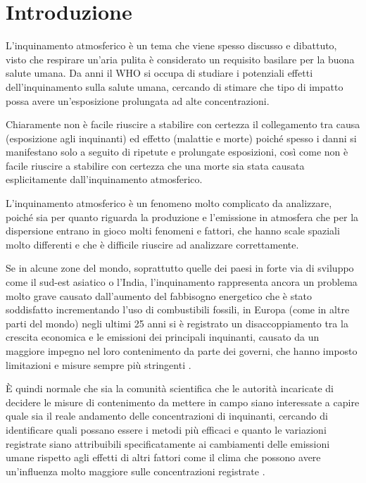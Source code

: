 \documentclass[a4paper]{report}
\begin{document}
\tableofcontents


\chapter{Introduzione}
L'inquinamento atmosferico è un tema che viene spesso discusso e dibattuto, visto che respirare un'aria pulita è considerato un requisito basilare per la buona salute umana. Da anni il WHO \cite{world2006air} si occupa di studiare i potenziali effetti dell'inquinamento sulla salute umana, cercando di stimare che tipo di impatto possa avere un'esposizione prolungata ad alte concentrazioni.  

Chiaramente non è facile riuscire a stabilire con certezza il collegamento tra causa (esposizione agli inquinanti) ed effetto (malattie e morte) poiché spesso i danni si manifestano solo a seguito di ripetute e prolungate esposizioni, così come non è facile riuscire a stabilire con certezza che una morte sia stata causata esplicitamente dall'inquinamento atmosferico.  

L'inquinamento atmosferico è un fenomeno molto complicato da analizzare, poiché sia per quanto riguarda la produzione e l'emissione in atmosfera che per la dispersione entrano in gioco molti fenomeni e fattori, che hanno scale spaziali molto differenti e che è difficile riuscire ad analizzare correttamente.  

Se in alcune zone del mondo, soprattutto quelle dei paesi in forte via di sviluppo come il sud-est asiatico o l'India, l'inquinamento rappresenta ancora un problema molto grave causato dall'aumento del fabbisogno energetico che è stato soddisfatto incrementando l'uso di combustibili fossili, in Europa (come in altre parti del mondo) negli ultimi 25 anni si è registrato un disaccoppiamento tra la crescita economica e le emissioni dei principali inquinanti, causato da un maggiore impegno nel loro contenimento da parte dei governi, che hanno imposto limitazioni e misure sempre più stringenti \cite{cattani2014analisi}.

È quindi normale che sia la comunità scientifica che le autorità incaricate di decidere le misure di contenimento da mettere in campo siano interessate a capire quale sia il reale andamento delle concentrazioni di inquinanti, cercando di identificare quali possano essere i metodi più efficaci e quanto le variazioni registrate siano attribuibili specificatamente ai cambiamenti delle emissioni umane rispetto agli effetti di altri fattori come il clima che possono avere un'influenza molto maggiore sulle concentrazioni registrate \cite{porter2001ozone}.  
\end{document}
